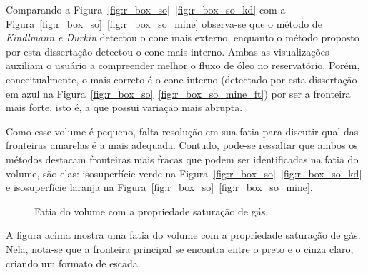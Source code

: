 	Comparando a Figura~\ref{fig:r_box_so}~\ref{fig:r_box_so_kd} com a Figura~\ref{fig:r_box_so}~\ref{fig:r_box_so_mine} observa-se que o método de \textit{Kindlmann e Durkin} detectou o cone mais externo, enquanto o método proposto por esta dissertação detectou o cone mais interno. Ambas as visualizações auxiliam o usuário a compreender melhor o fluxo de óleo no reservatório. Porém, conceitualmente, o mais correto é o cone interno (detectado por esta dissertação em azul na Figura~\ref{fig:r_box_so}~\ref{fig:r_box_so_mine_ft}) por ser a fronteira mais forte, isto é, a que possui variação mais abrupta.
	
	Como esse volume é pequeno, falta resolução em sua fatia para discutir qual das fronteiras amarelas é a mais adequada. Contudo, pode-se ressaltar que ambos os métodos destacam fronteiras mais fracas que podem ser identificadas na fatia do volume, são elas: isosuperfície verde na Figura~\ref{fig:r_box_so}~\ref{fig:r_box_so_kd} e isosuperfície laranja na Figura~\ref{fig:r_box_so}~\ref{fig:r_box_so_mine}.

\begin{figure}[h]
	\centering
	\caption{Fatia do volume  com a propriedade saturação de gás.}
\end{figure}

	A figura acima mostra uma fatia do volume  com a propriedade saturação de gás. Nela, nota-se que a fronteira principal se encontra entre o preto e o cinza claro, criando um formato de escada.

